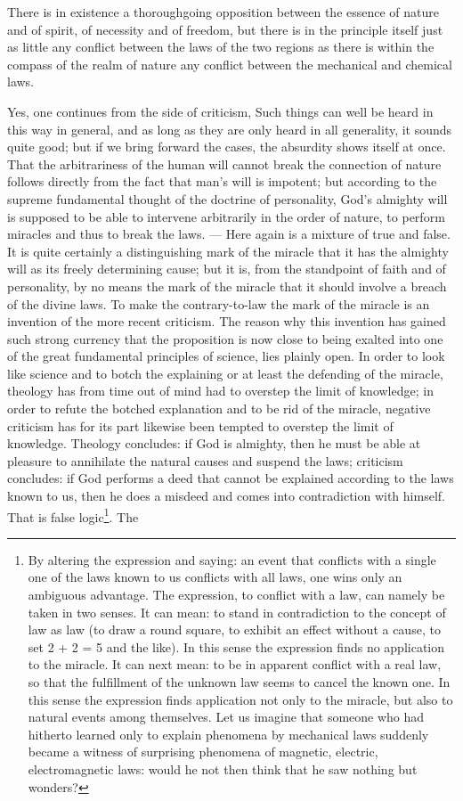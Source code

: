 \documentclass[12pt,a4paper,openany]{book}
\newcommand{\opage}[1]{\marginnote{\footnotesize\textit{[#1]}}}
\begin{document}
There is in existence a thoroughgoing opposition
between the essence of nature and of spirit, of necessity and
of freedom, but there is in the principle itself just as little
any conflict between the laws of the two regions as
there is within the compass of the realm of nature any conflict between
the mechanical and chemical laws.

Yes, one continues from the side of criticism, Such things can
well be heard in this way in general, and as long as they are only heard
in all generality, it sounds quite good; but if we bring forward
the cases, the absurdity shows itself at once. That
the arbitrariness of the human will cannot break
the connection of nature follows directly from the fact that man's
will is impotent; but according to the supreme fundamental thought
of the doctrine of personality, God's almighty will
is supposed to be able to intervene arbitrarily in the order of nature, to perform
miracles and thus to break the laws. --- Here again
is a mixture of true and false. It is quite certainly a
distinguishing mark of the miracle that it has the almighty will
as its freely determining cause; but it is, from the standpoint of faith and
of personality, by no means the mark of the miracle
that it should involve a breach of the divine
laws. To make the contrary-to-law the mark of the miracle
is an invention of the more recent criticism. The reason
\setcounter{footnote}{0}%
\opage{403}why this invention has gained such strong currency that the proposition
is now close to being exalted into one of the great
fundamental principles of science, lies plainly open.
In order to look like science and to botch the explaining
or at least the defending of the miracle, theology has from
time out of mind had to overstep the limit of knowledge; in
order to refute the botched explanation and to be rid of the miracle,
negative criticism has for its part likewise
been tempted to overstep the limit of knowledge. Theology
concludes: if God is almighty, then he must be able
at pleasure to annihilate the natural causes
and suspend the laws; criticism concludes: if God performs
a deed that cannot be explained according to the laws known to us,
then he does a misdeed and comes into
contradiction with himself. That is false logic\footnote[1]{By altering the expression and saying: an event that conflicts with a single one of the laws known to us conflicts with all laws, one wins only an ambiguous advantage. The expression, to conflict with a law, can namely be taken in two senses. It can mean: to stand in contradiction to the concept of law as law (to draw a round square, to exhibit an effect without a cause, to set 2 + 2 = 5 and the like). In this sense the expression finds no application to the miracle. It can next mean: to be in apparent conflict with a real law, so that the fulfillment of the unknown law seems to cancel the known one. In this sense the expression finds application not only to the miracle, but also to natural events among themselves. Let us imagine that someone who had hitherto learned only to explain phenomena by mechanical laws suddenly became a witness of surprising phenomena of magnetic, electric, electromagnetic laws: would he not then think that he saw nothing but wonders?}. The
\end{document}
